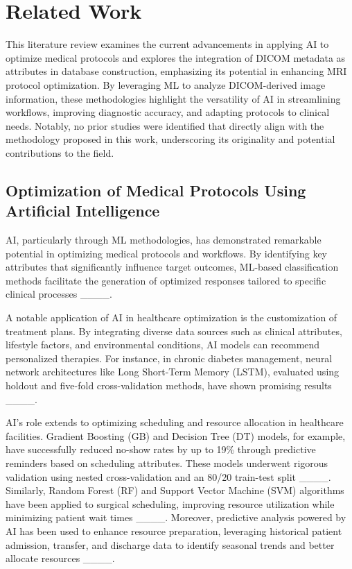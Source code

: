 \section{Related Work}
\label{sec:literature}

This literature review examines the current advancements in applying AI to optimize medical protocols and explores the integration of DICOM metadata as attributes in database construction, emphasizing its potential in enhancing MRI protocol optimization. By leveraging ML to analyze DICOM-derived image information, these methodologies highlight the versatility of AI in streamlining workflows, improving diagnostic accuracy, and adapting protocols to clinical needs. Notably, no prior studies were identified that directly align with the methodology proposed in this work, underscoring its originality and potential contributions to the field.

\subsection{Optimization of Medical Protocols Using Artificial Intelligence} \label{AIinOptMedical}

AI, particularly through ML methodologies, has demonstrated remarkable potential in optimizing medical protocols and workflows. By identifying key attributes that significantly influence target outcomes, ML-based classification methods facilitate the generation of optimized responses tailored to specific clinical processes ____.

A notable application of AI in healthcare optimization is the customization of treatment plans. By integrating diverse data sources such as clinical attributes, lifestyle factors, and environmental conditions, AI models can recommend personalized therapies. For instance, in chronic diabetes management, neural network architectures like Long Short-Term Memory (LSTM), evaluated using holdout and five-fold cross-validation methods, have shown promising results ____.

AI's role extends to optimizing scheduling and resource allocation in healthcare facilities. Gradient Boosting (GB) and Decision Tree (DT) models, for example, have successfully reduced no-show rates by up to 19\% through predictive reminders based on scheduling attributes. These models underwent rigorous validation using nested cross-validation and an 80/20 train-test split ____. Similarly, Random Forest (RF) and Support Vector Machine (SVM) algorithms have been applied to surgical scheduling, improving resource utilization while minimizing patient wait times ____. Moreover, predictive analysis powered by AI has been used to enhance resource preparation, leveraging historical patient admission, transfer, and discharge data to identify seasonal trends and better allocate resources ____.

